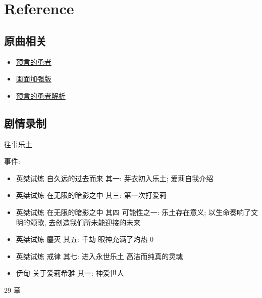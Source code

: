 \documentclass[a4paper]{article}
\begin{document}
\section{Reference}

\subsection{原曲相关}

\begin{itemize}
    \item \href{https://www.bilibili.com/video/BV1Zf4y1Z75m/}{预言的勇者}
    \item \href{https://www.bilibili.com/video/BV1rr4y177C9/}{画面加强版}
    \item \href{https://www.bilibili.com/video/BV1KT411z7Vr/}{预言的勇者解析}
\end{itemize}

\subsection{剧情录制}

往事乐土

事件:

\begin{itemize}
    \item 英桀试炼 自久远的过去而来 其一: 芽衣初入乐土; 爱莉自我介绍
    \item 英桀试炼 在无限的暗影之中 其三: 第一次打爱莉
    \item 英桀试炼 在无限的暗影之中 其四 可能性之一: 乐土存在意义; 以生命奏响了文明的颂歌, 去创造我们所未能迎接的未来
    \item 英桀试炼 鏖灭 其五: 千劫 眼神充满了灼热 0
    \item 英桀试炼 戒律 其七: 进入永世乐土 高洁而纯真的灵魂
    \item 伊甸 关于爱莉希雅 其一: 神爱世人
\end{itemize}

29 章
\end{document}
